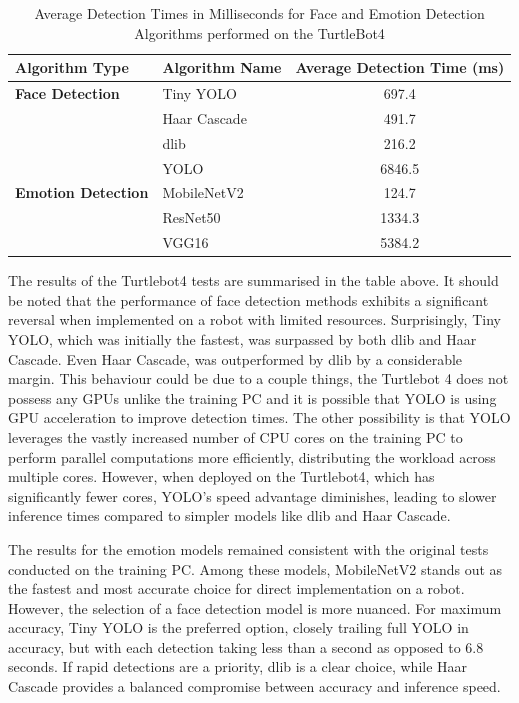 \begin{table}[h!]
\centering{}
\caption{Average Detection Times in Milliseconds for Face and Emotion Detection Algorithms performed on the TurtleBot4}
\begin{tabular}{|l|l|c|}
\hline
\textbf{Algorithm Type} & \textbf{Algorithm Name} & \textbf{Average Detection Time (ms)} \\ \hline
\textbf{Face Detection} & Tiny YOLO               & 697.4                                \\ \cline{2-3}
                        & Haar Cascade            & 491.7                                \\ \cline{2-3}
                        & dlib                    & 216.2                                \\ \cline{2-3}
                        & YOLO                    & 6846.5                               \\ \hline
\textbf{Emotion Detection} & MobileNetV2          & 124.7                                \\ \cline{2-3}
                        & ResNet50                & 1334.3                               \\ \cline{2-3}
                        & VGG16                   & 5384.2                               \\ \hline
\end{tabular}
\label{tab:algorithm_detection_times_ms_robot}
\end{table}

The results of the Turtlebot4 tests are summarised in the table above. It should be noted that the performance of face detection methods exhibits a significant reversal when implemented on a robot with limited resources. Surprisingly, Tiny YOLO, which was initially the fastest, was surpassed by both dlib and Haar Cascade. Even Haar Cascade, was outperformed by dlib by a considerable margin. This behaviour could be due to a couple things, the Turtlebot 4 does not possess any GPUs unlike the training PC and it is possible that YOLO is using GPU acceleration to improve detection times. The other possibility is that YOLO leverages the vastly increased number of CPU cores on the training PC to perform parallel computations more efficiently, distributing the workload across multiple cores. However, when deployed on the Turtlebot4, which has significantly fewer cores, YOLO's speed advantage diminishes, leading to slower inference times compared to simpler models like dlib and Haar Cascade.

The results for the emotion models remained consistent with the original tests conducted on the training PC. Among these models, MobileNetV2 stands out as the fastest and most accurate choice for direct implementation on a robot. However, the selection of a face detection model is more nuanced. For maximum accuracy, Tiny YOLO is the preferred option, closely trailing full YOLO in accuracy, but with each detection taking less than a second as opposed to 6.8 seconds. If rapid detections are a priority, dlib is a clear choice, while Haar Cascade provides a balanced compromise between accuracy and inference speed.